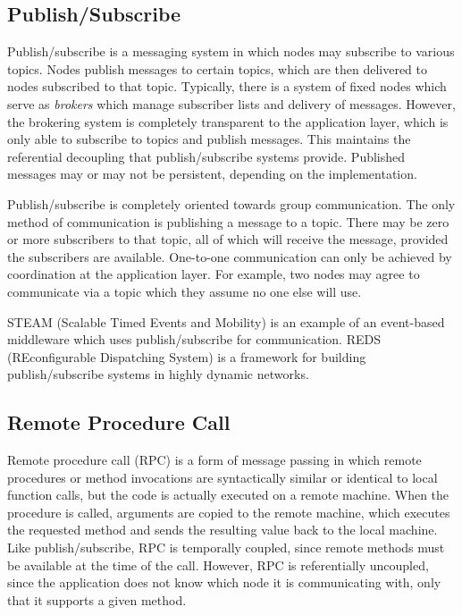 \subsection{Publish/Subscribe}

Publish/subscribe is a messaging system in which nodes may subscribe to various topics. Nodes publish messages to certain topics, which are then delivered to nodes subscribed to that topic. Typically, there is a system of fixed nodes which serve as \textit{brokers} which manage subscriber lists and delivery of messages. However, the brokering system is completely transparent to the application layer, which is only able to subscribe to topics and publish messages. This maintains the referential decoupling that publish/subscribe systems provide. Published messages may or may not be persistent, depending on the implementation.

Publish/subscribe is completely oriented towards group communication. The only method of communication is publishing a message to a topic. There may be zero or more subscribers to that topic, all of which will receive the message, provided the subscribers are available. One-to-one communication can only be achieved by coordination at the application layer. For example, two nodes may agree to communicate via a topic which they assume no one else will use.

STEAM (Scalable Timed Events and Mobility)\cite{steam} is an example of an event-based middleware which uses publish/subscribe for communication. REDS (REconfigurable Dispatching System) is a framework for building publish/subscribe systems in highly dynamic networks.

\subsection{Remote Procedure Call}

Remote procedure call (RPC) is a form of message passing in which remote procedures or method invocations are syntactically similar or identical to local function calls, but the code is actually executed on a remote machine. When the procedure is called, arguments are copied to the remote machine, which executes the requested method and sends the resulting value back to the local machine. Like publish/subscribe, RPC is temporally coupled, since remote methods must be available at the time of the call. However, RPC is referentially uncoupled, since the application does not know which node it is communicating with, only that it supports a given method.

